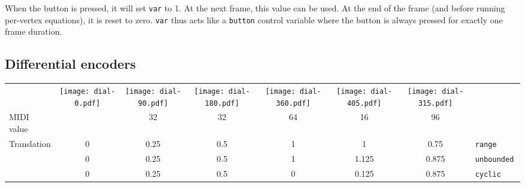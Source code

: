 \documentclass[11pt,a4paper]{article}
\newenvironment{expose}{\vskip3mm\qquad\begin{raggedright}}{%
\end{raggedright}\vskip3mm}
\begin{document}
When the button is pressed, it will set {\tt var} to 1. At the next
frame, this value can be used. At the end of the frame (and before
running per-vertex equations), it is reset to zero. {\tt var} thus
acts like a {\tt button} control variable where the button is always
pressed for exactly one frame duration.




\subsection{Differential encoders}
\label{diff}

\begin{expose}
\begin{tabular}{lccccccl}
  \raisebox{6mm}{User input} &
  \texttt{[image: dial-0.pdf]} &
  \texttt{[image: dial-90.pdf]} &
  \texttt{[image: dial-180.pdf]} &
  \texttt{[image: dial-360.pdf]} &
  \texttt{[image: dial-405.pdf]} &
  \texttt{[image: dial-315.pdf]} \\
  \cmidrule(r){1-7}
  MIDI value &
  & 32 & 32 & 64 & 16 & 96 \\
  \midrule
  Translation
  & 0 & 0.25 & 0.5 & 1 & 1 & 0.75 & \tt range \\
  & 0 & 0.25 & 0.5 & 1 & 1.125 & 0.875 & \tt unbounded \\
  & 0 & 0.25 & 0.5 & 0 & 0.125 & 0.875 & \tt cyclic \\
\end{tabular}
\end{expose}

\end{document}
